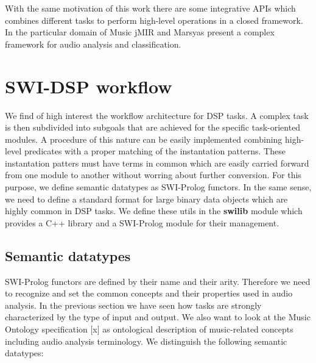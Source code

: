 \documentclass{article}
\begin{document}
With the same motivation of this work there are some integrative APIs which combines different tasks to perform high-level operations in a closed framework. In the particular domain of Music jMIR and Marsyas present a complex framework for audio analysis and classification.

\section{SWI-DSP workflow}

We find of high interest the workflow architecture for DSP tasks. A complex task is then subdivided into subgoals that are achieved for the specific task-oriented modules. A procedure of this nature can be easily implemented combining high-level predicates with a proper matching of the instantation patterns. These instantation patters must have terms in common which are easily carried forward from one module to another without worring about further conversion. For this purpose, we define semantic datatypes as SWI-Prolog functors. In the same sense, we need to define a standard format for large binary data objects which are highly common in DSP tasks. We define these utils in the \textbf{swilib} module which provides a C++ library and a SWI-Prolog module for their management.

\subsection{Semantic datatypes}

SWI-Prolog functors are defined by their name and their arity. Therefore we need to recognize and set the common concepts and their properties used in audio analysis. In the previous section we have seen how tasks are strongly characterized by the type of input and output. We also want to look at the Music Ontology specification [x] as ontological description of music-related concepts including audio analysis terminology. We distinguish the following semantic datatypes:
\end{document}
